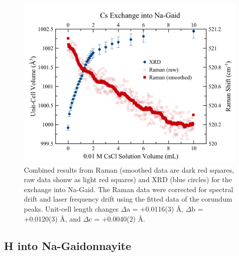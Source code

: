 \documentclass[journal=acsodf,manuscript=article]{achemso}
\begin{document}
 
\begin{figure}[h!]   %
\begin{center}
\includegraphics[width=0.70\columnwidth]{figures/XRD-Raman_Cs_into_Na-gaid.png}
\caption{{Combined results from Raman (smoothed data are dark red squares, raw data shonw as light red squares) and XRD (blue circles) for the  exchange into Na-Gaid.  The Raman data were corrected for spectral drift and laser frequency drift using the fitted data of the corundum peaks.  Unit-cell length changes \(\Delta\)a =
+0.0116(3) \AA, \(\Delta\)b = +0.0120(3) \AA, and
\(\Delta\)c = +0.0040(2) \AA.
{\label{fig_cs_na_gaid}}%
}}
\end{center}
\end{figure} 

\subsection{H into Na-Gaidonnayite}
{\label{sec_h_na}}  %
\end{document}
